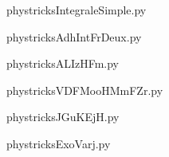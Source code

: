     \newcommand{\CaptionFigIntegraleSimple}{<+Type your caption here+>}
    \begin{center}
        
    \end{center}
    phystricksIntegraleSimple.py

    

    \clearpage
    


    \newcommand{\CaptionFigAdhIntFrDeux}{<+Type your caption here+>}
    \begin{center}
        
    \end{center}
    phystricksAdhIntFrDeux.py

    

    \clearpage
    


    \newcommand{\CaptionFigALIzHFm}{<+Type your caption here+>}
    \begin{center}
        
    \end{center}
    phystricksALIzHFm.py

    

    \clearpage
    


    \newcommand{\CaptionFigVDFMooHMmFZr}{<+Type your caption here+>}
    \begin{center}
        
    \end{center}
    phystricksVDFMooHMmFZr.py

    

    \clearpage
    


    \newcommand{\CaptionFigJGuKEjH}{<+Type your caption here+>}
    \begin{center}
        
    \end{center}
    phystricksJGuKEjH.py

    

    \clearpage
    


    \newcommand{\CaptionFigExoVarj}{<+Type your caption here+>}
    \begin{center}
        
    \end{center}
    phystricksExoVarj.py

